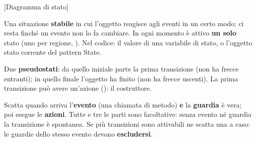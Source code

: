 [Diagramma di stato]

  {}
  {Una situazione \textbf{stabile} in cui l'oggetto reagisce agli eventi in un certo modo; ci resta finché un evento
   non lo fa cambiare. In ogni momento è attivo \textbf{un solo} stato (uno per regione, ). Nel codice: il
   valore di una variabile di stato, o l'oggetto stato corrente del pattern State.}

  {}
  {Due \textbf{pseudostati}: da quello iniziale parte la prima transizione (non ha frecce entranti); in quello finale
   l'oggetto ha finito (non ha frecce uscenti). La prima transizione può avere un'azione (): il
   costruttore.}

  {}
  {Scatta quando arriva l'\textcolor{q8}{\textbf{evento}} (una chiamata di metodo) \textbf{e} la
   \textcolor{swred}{\textbf{guardia}} è vera; poi esegue le \textcolor{q7}{\textbf{azioni}}. Tutte e tre le parti sono
   facoltative: senza evento né guardia la transizione è spontanea. Se più transizioni sono attivabili ne scatta una a
   caso: le guardie dello stesso evento devono \textbf{escludersi}.}

